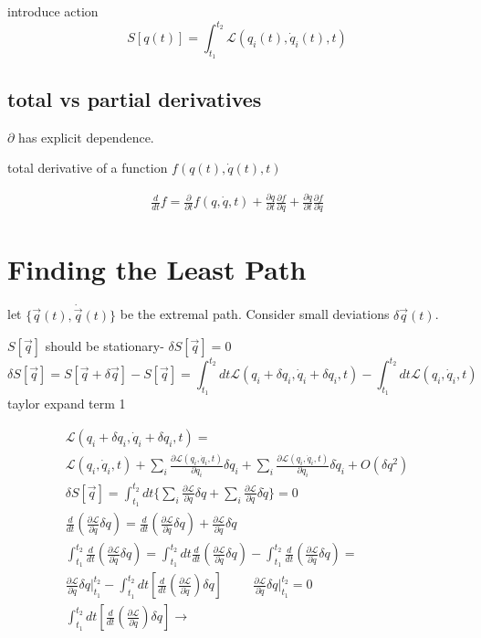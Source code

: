 \documentclass[fleqn]{report}
\newcommand{\hp}{\hspace{1cm}}
\newcommand{\del}{\partial}
\newcommand{\equations} [1] {
\begin{gather*}
#1
\end{gather*}
}
\begin{document}
introduce action 
\[
    S[q(t)] = 
    \int^{t_2}_{t_1} \mathcal L(q_i(t), \dot q_i(t),  t)
\]


\subsection{total vs partial derivatives}
$\del$ has explicit dependence.

total derivative of a function $f(q(t), \dot q(t), t)$
\equations{
    \frac{d}{dt} f = \frac{\del}{\del t} f(q, \dot q, t) + 
    \frac{\del q}{\del t} \frac{\del f}{\del q} +
    \frac{\del \dot q}{\del t} \frac{\del f}{\del \dot q}
}

\section{Finding the Least Path}

let $\{\vec q(t), \dot \vec q(t) \}$ be the extremal path. Consider 
small deviations $\delta \vec q(t)$. 

$S[\vec q]$ should be stationary- $\delta S[\vec q] = 0$
\[
\delta S[\vec q] = S[\vec q + \delta \vec q] - S[\vec q]
=
\int^{t_2}_{t_1} dt \mathcal L(q_i + \delta q_i, \dot q_i + \delta q_i, t) - 
\int^{t_2}_{t_1} dt \mathcal L(q_i, \dot q_i, t) 
\]
taylor expand term 1
\equations{
    \mathcal L(q_i + \delta q_i, \dot q_i + \delta q_i, t) 
    = 
    \\
    \mathcal L(q_i, \dot q_i, t) +
    \sum_i \frac{\del \mathcal L(q_i, \dot q_i, t)}{\del q_i} \delta q_i + 
    \sum_i \frac{\del \mathcal L(q_i, \dot q_i, t)}{\del q_i} \delta \dot q_i
    + O(\delta q^2)
    \\
    \delta S[\vec q] = \int^{t_2}_{t_1}
    dt \{
        \sum_i \frac{\del \mathcal L}{\del q} \delta q +      
        \sum_i \frac{\del \mathcal L}{\del \dot q} \delta \dot q 
    \}
    = 0
    \\
    \frac{d}{dt} \left(
        \frac{\del \mathcal L}{\del \dot q} \delta q
    \right)
    = 
    \frac{d}{dt}
    \left(
        \frac{\del \mathcal L}{\del \dot q} \delta q
    \right)
    +
    \frac{\del \mathcal L}{\del \dot q} \delta \dot q
    \\
    \int^{t_2}_{t_1}
    \frac{d}{dt} \left(
        \frac{\del \mathcal L}{\del \dot q} \delta q
    \right) 
    =
    \int^{t_2}_{t_1}
    dt 
    \frac{d}{dt}
    \left(
        \frac{\del \mathcal L}{\del \dot q} \delta q
    \right)
    -
    \int^{t_2}_{t_1}
    \frac{d}{dt}
    \left( 
    \frac{\del \mathcal L}{\del \dot q} \delta q
    \right)
    =
    \\
    \frac{\del \mathcal L}{\del \dot q} \delta q \Big|^{t_2}_{t_1} 
    - 
    \int^{t_2}_{t_1}
    dt 
    \left[
        \frac{d}{dt}
        \left(
            \frac{\del \mathcal L}{\del \dot q}
        \right)    
        \delta q
    \right]
    \hp
    \frac{\del \mathcal L}{\del \dot q} \delta q \Big|^{t_2}_{t_1} 
    = 0
    \\
    \int^{t_2}_{t_1}
    dt 
    \left[
        \frac{d}{dt}
        \left(
            \frac{\del \mathcal L}{\del \dot q}
        \right)    
        \delta q
    \right]
    \rightarrow 
}
\end{document}

